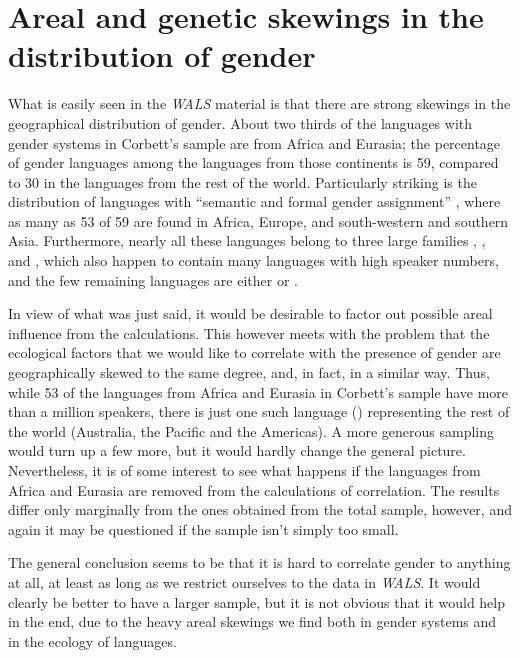 \documentclass[output=collectionpaper]{langsci/langscibook}
\begin{document}
\section{Areal and genetic skewings in the distribution of gender}

What is easily seen in the \textit{WALS} material is that there are strong skewings in the geographical distribution of gender. About two thirds of the languages with gender systems in Corbett’s sample are from Africa and Eurasia; the percentage of gender languages among the languages from those continents is 59, compared to 30 in the languages from the rest of the world. Particularly striking is the distribution of languages with ``semantic and formal gender assignment'' \citep{Corbett2013b}, where as many as 53 of 59 are found in Africa, Europe, and south-western and southern Asia. Furthermore, nearly all these languages belong to three large families \textendash{} , , and , which also happen to contain many languages with high speaker numbers, and the few remaining languages are either  or .

In view of what was just said, it would be desirable to factor out possible areal influence from the calculations. This however meets with the problem that the ecological factors that we would like to correlate with the presence of gender are geographically skewed to the same degree, and, in fact, in a similar way. Thus, while 53 of the languages from Africa and Eurasia in Corbett’s sample have more than a million speakers, there is just one such language () representing the rest of the world (Australia, the Pacific and the Americas). A more generous sampling would turn up a few more, but it would hardly change the general picture. Nevertheless, it is of some interest to see what happens if the languages from Africa and Eurasia are removed from the calculations of correlation. The results differ only marginally from the ones obtained from the total sample, however, and again it may be questioned if the sample isn’t simply too small.

The general conclusion seems to be that it is hard to correlate gender to anything at all, at least as long as we restrict ourselves to the data in \textit{WALS}. It would clearly be better to have a larger sample, but it is not obvious that it would help in the end, due to the heavy areal skewings we find both in gender systems and in the ecology of languages.
\end{document}

